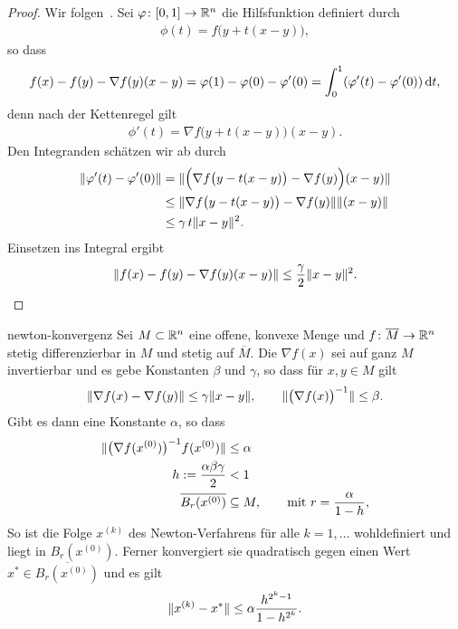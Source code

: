 \begin{proof}
  Wir folgen~\cite[Hilfssatz 5.3.1]{Stoer83}.
  Sei $\varphi\colon[0,1] \to \mathbb R^n$ die Hilfsfunktion definiert durch
  \begin{gather}
    \phi(t) = f\bigl(y+t(x-y)\bigr),
  \end{gather}
  so dass
  \begin{gather}
    f(x)-f(y) - \nabla f(y)(x-y) = \varphi(1) - \varphi(0) - \varphi'(0)
    = \int_0^1 (\varphi'(t)-\varphi'(0))\,\mathrm{d} t,
  \end{gather}
  denn nach der Kettenregel gilt
  \begin{gather}
    \phi'(t) = \nabla f\bigl(y+t(x-y)\bigr)(x-y).
  \end{gather}
  Den Integranden schätzen wir ab durch
  \begin{align}
    \lVert\varphi'(t)-\varphi'(0)\rVert
    & = \lVert\Bigl(\nabla f\bigl(y-t(x-y)\bigr) - \nabla f(y)\Bigr)(x-y)\rVert
    \\
    & \le \lVert\nabla f\bigl(y-t(x-y)\bigr) - \nabla f(y)\rVert\lVert(x-y)\rVert
    \\
    & \le \gamma\,t\lVert x-y\rVert^2.
  \end{align}
  Einsetzen ins Integral ergibt
  \begin{gather}
    \lVert f(x)-f(y) - \nabla f(y)(x-y)\rVert
    \le \frac\gamma2 \lVert x-y\rVert^2.
  \end{gather}
\end{proof}

\begin{Satz}{newton-konvergenz}
  Sei $M\subset \mathbb R^n$ eine offene, konvexe Menge und
  $f\colon \overline{M} \to \mathbb R^n$ stetig differenzierbar in $M$ und
  stetig auf $\overline{M}$. Die  $\nabla f(x)$
  sei auf ganz $M$ invertierbar und es gebe Konstanten $\beta$ und
  $\gamma$, so dass für $x,y\in M$ gilt
  \begin{gather}
    \label{eq:newton:2}
    \lVert\nabla f(x) - \nabla f(y)\rVert \le \gamma \lVert x-y\rVert,
    \qquad \lVert\bigl(\nabla f(x)\bigr)^{-1}\rVert \le \beta.
  \end{gather}
  Gibt es dann eine Konstante $\alpha$, so dass
  \begin{align}
    \label{eq:newton:3}
    \lVert\bigl(\nabla f(x^{(0)})\bigr)^{-1} f(x^{(0)})\rVert
    &\le \alpha\\
    h := \frac{\alpha\beta\gamma}2 &<1\\
    \overline{B_r(x^{(0)})} &\subseteq M, \qquad\text{mit } r=\frac{\alpha}{1-h},
  \end{align}
  So ist die Folge $x^{(k)}$ des Newton-Verfahrens für alle
  $k=1,\dots$ wohldefiniert und liegt in $B_r(x^{(0)})$. Ferner
  konvergiert sie quadratisch gegen einen Wert
  $x^*\in\overline{B_r(x^{(0)})}$ und es gilt
  \begin{gather}
    \label{eq:newton:4}
    \lVert x^{(k)}-x^*\rVert \le \alpha\frac{h^{2^k-1}}{1-h^{2^k}}.
  \end{gather}
\end{Satz}

